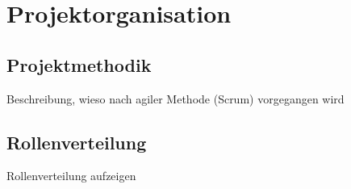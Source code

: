 \documentclass[%
	ngerman,
	12pt,
	a4paper,
	oneside
]{scrbook}
\begin{document}
\chapter{Projektorganisation}
\section{Projektmethodik}
Beschreibung, wieso nach agiler Methode (Scrum) vorgegangen wird
\section{Rollenverteilung}
Rollenverteilung aufzeigen
\end{document}
